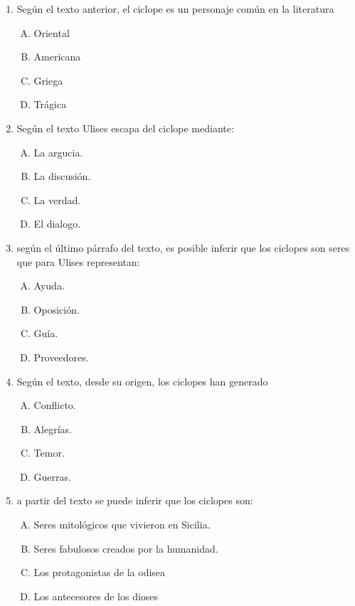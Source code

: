 \begin{enumerate}

\item Según el texto anterior, el ciclope es un personaje común en la literatura \label{lit-1}
\begin{enumerate}[(A)]
\item Oriental
\item Americana
\item Griega
\item Trágica 
\end{enumerate}



\item Según el texto Ulises escapa del ciclope mediante:\label{lit-2}
\begin{enumerate}[(A)]
\item La argucia.
\item La discusión. 
\item La verdad. 
\item El dialogo.
\end{enumerate}


\item según el último párrafo del texto, es posible inferir que los ciclopes son seres que para Ulises representan: \label{lit-3}
\begin{enumerate}[(A)]
\item Ayuda. 
\item Oposición.
\item Guía. 
\item Proveedores.
\end{enumerate}

\item Según el texto, desde su origen, los ciclopes han generado\label{lit-4}
\begin{enumerate}[(A)]
\item Conflicto.
\item Alegrías.
\item Temor.
\item Guerras.
\end{enumerate}


\item a partir del texto se puede inferir que los ciclopes  son:\label{lit-5}

\begin{enumerate}[(A)]
\item Seres mitológicos que vivieron en Sicilia.
\item Seres fabulosos creados por la humanidad. 
\item Los protagonistas de la odisea
\item Los antecesores de los dioses
\end{enumerate}




\end{enumerate}
